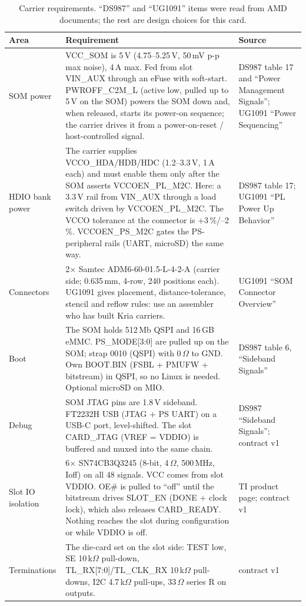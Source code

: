 \documentclass[10pt,a4paper]{article}
\begin{document}
\begin{table}[H]\centering\footnotesize
\caption{Carrier requirements. ``DS987'' and ``UG1091'' items were read from AMD documents; the rest are design choices for this card.}
\begin{tabularx}{\textwidth}{@{}P{2.8cm}LP{2.2cm}@{}}
\toprule
{}Area & Requirement & Source\\
\midrule
SOM power & VCC\_SOM is 5\,V (4.75--5.25\,V, 50\,mV p-p max noise), 4\,A max. Fed from slot VIN\_AUX through an eFuse with soft-start. PWROFF\_C2M\_L (active low, pulled up to 5\,V on the SOM) powers the SOM down and, when released, starts its power-on sequence; the carrier drives it from a power-on-reset / host-controlled signal. & DS987 table 17 and ``Power Management Signals''; UG1091 ``Power Sequencing''\\
HDIO bank power & The carrier supplies VCCO\_HDA/HDB/HDC (1.2--3.3\,V, 1\,A each) and must enable them only after the SOM asserts VCCOEN\_PL\_M2C. Here: a 3.3\,V rail from VIN\_AUX through a load switch driven by VCCOEN\_PL\_M2C. The VCCO tolerance at the connector is +3\,\%/--2\,\%. VCCOEN\_PS\_M2C gates the PS-peripheral rails (UART, microSD) the same way. & DS987 table 17; UG1091 ``PL Power Up Behavior''\\
Connectors & 2$\times$ Samtec ADM6-60-01.5-L-4-2-A (carrier side; 0.635\,mm, 4-row, 240 positions each). UG1091 gives placement, distance-tolerance, stencil and reflow rules: use an assembler who has built Kria carriers. & UG1091 ``SOM Connector Overview''\\
Boot & The SOM holds 512\,Mb QSPI and 16\,GB eMMC. PS\_MODE[3:0] are pulled up on the SOM; strap 0010 (QSPI) with 0\,$\Omega$ to GND. Own BOOT.BIN (FSBL + PMUFW + bitstream) in QSPI, so no Linux is needed. Optional microSD on MIO. & DS987 table 6, ``Sideband Signals''\\
Debug & SOM JTAG pins are 1.8\,V sideband. FT2232H USB (JTAG + PS UART) on a USB-C port, level-shifted. The slot CARD\_JTAG (VREF = VDDIO) is buffered and muxed into the same chain. & DS987 ``Sideband Signals''; contract v1\\
Slot IO isolation & 6$\times$ SN74CB3Q3245 (8-bit, 4\,$\Omega$, 500\,MHz, Ioff) on all 48 signals. VCC comes from slot VDDIO. OE\# is pulled to ``off'' until the bitstream drives SLOT\_EN (DONE + clock lock), which also releases CARD\_READY. Nothing reaches the slot during configuration or while VDDIO is off. & TI product page; contract v1\\
Terminations & The die-card set on the slot side: TEST low, SE 10\,k$\Omega$ pull-down, TL\_RX[7:0]/TL\_CLK\_RX 10\,k$\Omega$ pull-downs, I2C 4.7\,k$\Omega$ pull-ups, 33\,$\Omega$ series R on outputs. & contract v1\\

\end{tabularx}
\end{table}
\end{document}
